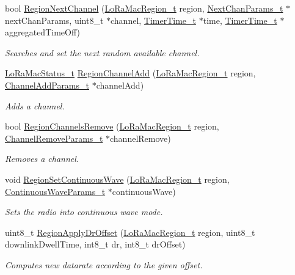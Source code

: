 \begin{DoxyCompactItemize}
bool \hyperlink{group__REGION_ga2139de3f2832789797c8853764655398}{Region\+Next\+Channel} (\hyperlink{group__LORAMAC_ga80c48efda9ae02e14b58160d34a798dd}{Lo\+Ra\+Mac\+Region\+\_\+t} region, \hyperlink{group__REGION_ga115f5e83afae352c0a3dcdc193374040}{Next\+Chan\+Params\+\_\+t} $\ast$next\+Chan\+Params, uint8\+\_\+t $\ast$channel, \hyperlink{utilities_8h_a4215ca43d3e953099ea758ce428599d0}{Timer\+Time\+\_\+t} $\ast$time, \hyperlink{utilities_8h_a4215ca43d3e953099ea758ce428599d0}{Timer\+Time\+\_\+t} $\ast$aggregated\+Time\+Off)
\begin{DoxyCompactList}\small\item\em Searches and set the next random available channel. \end{DoxyCompactList}\item 
\hyperlink{group__LORAMAC_ga30bd25657e10480f8605ee951b0ecfbd}{Lo\+Ra\+Mac\+Status\+\_\+t} \hyperlink{group__REGION_gaaa5767f33e988a641abf509ad278ae14}{Region\+Channel\+Add} (\hyperlink{group__LORAMAC_ga80c48efda9ae02e14b58160d34a798dd}{Lo\+Ra\+Mac\+Region\+\_\+t} region, \hyperlink{group__REGION_gab1c5f3aa06614283202906cef4417860}{Channel\+Add\+Params\+\_\+t} $\ast$channel\+Add)
\begin{DoxyCompactList}\small\item\em Adds a channel. \end{DoxyCompactList}\item 
bool \hyperlink{group__REGION_ga50b3505e13d8373fef6e2be6d48e150c}{Region\+Channels\+Remove} (\hyperlink{group__LORAMAC_ga80c48efda9ae02e14b58160d34a798dd}{Lo\+Ra\+Mac\+Region\+\_\+t} region, \hyperlink{group__REGION_gaa37468560d2fc81a977b57a48e5d72c0}{Channel\+Remove\+Params\+\_\+t} $\ast$channel\+Remove)
\begin{DoxyCompactList}\small\item\em Removes a channel. \end{DoxyCompactList}\item 
void \hyperlink{group__REGION_ga22327f217ed10d84c89b6785143be5b8}{Region\+Set\+Continuous\+Wave} (\hyperlink{group__LORAMAC_ga80c48efda9ae02e14b58160d34a798dd}{Lo\+Ra\+Mac\+Region\+\_\+t} region, \hyperlink{group__REGION_gaf39bb5ba06921139c6d17f88a8d518cd}{Continuous\+Wave\+Params\+\_\+t} $\ast$continuous\+Wave)
\begin{DoxyCompactList}\small\item\em Sets the radio into continuous wave mode. \end{DoxyCompactList}\item 
uint8\+\_\+t \hyperlink{group__REGION_gab62221e1ca566a89f4b450b30bfb95a7}{Region\+Apply\+Dr\+Offset} (\hyperlink{group__LORAMAC_ga80c48efda9ae02e14b58160d34a798dd}{Lo\+Ra\+Mac\+Region\+\_\+t} region, uint8\+\_\+t downlink\+Dwell\+Time, int8\+\_\+t dr, int8\+\_\+t dr\+Offset)
\begin{DoxyCompactList}\small\item\em Computes new datarate according to the given offset. \end{DoxyCompactList}\end{DoxyCompactItemize}


